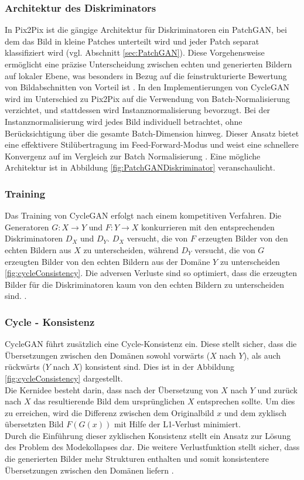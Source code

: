 \subsubsection{Architektur des Diskriminators}
In Pix2Pix ist die gängige Architektur für Diskriminatoren ein PatchGAN, bei dem das Bild in kleine Patches unterteilt wird und jeder Patch separat klassifiziert wird (vgl. Abschnitt \ref{sec:PatchGAN}). Diese Vorgehensweise ermöglicht eine präzise Unterscheidung zwischen echten und generierten Bildern auf lokaler Ebene, was besonders in Bezug auf die feinstrukturierte Bewertung von Bildabschnitten von Vorteil ist \cite{Zhu.2017}.
\newline
In den Implementierungen von CycleGAN wird im Unterschied zu Pix2Pix auf die Verwendung von Batch-Normalisierung verzichtet, und stattdessen wird Instanznormalisierung bevorzugt. Bei der Instanznormalisierung wird jedes Bild individuell betrachtet, ohne Berücksichtigung über die gesamte Batch-Dimension hinweg. Dieser Ansatz bietet eine effektivere Stilübertragung im Feed-Forward-Modus und weist eine schnellere Konvergenz auf im Vergleich zur Batch Normalisierung \cite{Huang.2017}. Eine mögliche Architektur ist in Abbildung \ref{fig:PatchGANDiskriminator} veranschaulicht.

\subsubsection{Training}
Das Training von CycleGAN erfolgt nach einem kompetitiven Verfahren. Die Generatoren $G:X\rightarrow Y$ und $F:Y\rightarrow X$ konkurrieren mit den entsprechenden Diskriminatoren $D_X$ und $D_Y$. $D_X$ versucht, die von $F$ erzeugten Bilder von den echten Bildern aus $X$ zu unterscheiden, während $D_Y$ versucht, die von $G$ erzeugten Bilder von den echten Bildern aus der Domäne $Y$ zu unterscheiden \ref{fig:cycleConsistency}. Die adversen Verluste sind so optimiert, dass die erzeugten Bilder für die Diskriminatoren kaum von den echten Bildern zu unterscheiden sind. \cite{Zhu.2017}.

\subsubsection{Cycle - Konsistenz}
CycleGAN führt zusätzlich eine Cycle-Konsistenz ein. Diese stellt sicher, dass die Übersetzungen zwischen den Domänen sowohl vorwärts ($X$ nach $Y$), als auch rückwärts ($Y$ nach $X$) konsistent sind. Dies ist in der Abbildung \ref{fig:cycleConsistency} dargestellt.
\\
Die Kernidee besteht darin, dass nach der Übersetzung von $X$ nach $Y$ und zurück nach $X$ das resultierende Bild dem ursprünglichen $X$ entsprechen sollte. Um dies zu erreichen, wird die Differenz zwischen dem Originalbild $x$ und dem zyklisch übersetzten Bild $F(G(x))$ mit Hilfe der L1-Verlust minimiert. 
\\
Durch die Einführung dieser zyklischen Konsistenz stellt ein Ansatz zur Lösung des Problem des Modekollapses dar. Die weitere Verlustfunktion stellt sicher, dass die generierten Bilder mehr Strukturen enthalten und somit konsistentere Übersetzungen zwischen den Domänen liefern \cite{Zhu.2017}.

